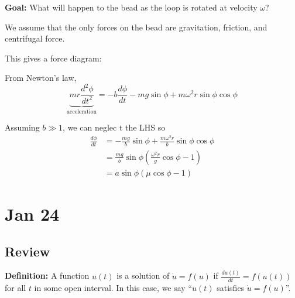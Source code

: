 \documentclass[12pt]{article}
\newcommand*{\tbf}[1]{\ifmmode\mathbf{#1}\else\textbf{#1}\fi}
\begin{document}
\tbf{Goal:} What will happen to the bead as the loop is rotated at velocity $\omega$?

We assume that the only forces on the bead are gravitation, friction, and centrifugal force.

This gives a force diagram:
\begin{center}
\end{center}

From Newton's law,
\[\underbrace{mr \frac{d^2\phi}{dt^2}}_{\text{acceleration}} = -b \frac{d\phi}{dt} - mg \sin \phi + m\omega^2 r \sin\phi \cos \phi\]

Assuming $b \gg 1$, we can neglec
t the LHS so
\begin{align*}
    \frac{d\phi}{dt} & = -\frac{mg}{b}\sin \phi + \frac{m\omega^2 r}{b} \sin \phi \cos \phi    \\
                     & = \frac{mg}{b} \sin \phi \left(\frac{\omega^2 r}{g} \cos \phi- 1\right) \\
                     & = a \sin \phi (\mu \cos \phi - 1)
\end{align*}

\section{Jan 24}
\subsection*{Review}
\tbf{Definition:} A function $u(t)$ is a solution of $\dot u = f(u)$ if $\frac{du(t)}{dt} = f(u(t))$ for all $t$ in some open interval. In this case, we say ``$u(t)$ satisfies $\dot u = f(u)$''.
\end{document}
